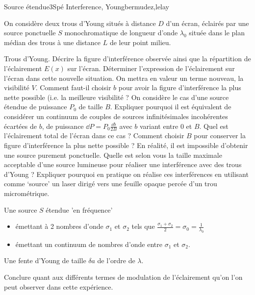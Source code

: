 \begin{exercise}{Source étendue}{3}{Spé}
{Interference, Young}{bermudez,lelay}

On considère deux trous d'Young situés à distance $D$ d'un écran, éclairés par une source ponctuelle $S$ monochromatique de longueur d'onde $\lambda_0$ située dans le plan médian des trous à une distance $L$ de leur point milieu.

\begin{questions}
    \questioncours Trous d'Young. Décrire la figure d'interférence observée ainsi que la répartition de l'éclairement $E(x)$ sur l'écran.
    \question Déterminer l'expression de l'éclairement sur l'écran dans cette nouvelle situation. On mettra en valeur un terme nouveau, la visibilité $V$. Comment faut-il choisir $b$ pour avoir la figure d'interférence la plus nette possible (i.e. la meilleure visibilité ?
    \question On considère le cas d'une source étendue de puissance $P_0$ de taille $B$. Expliquer pourquoi il est équivalent de considérer un continuum de couples de sources infinitésimales incohérentes écartées de $b$, de puissance $\dd{P} = P_0 \frac{\dd{b}}{2B}$ avec $b$ variant entre $0$ et $B$.
    \question Quel est l'éclairement total de l'écran dans ce cas ? Comment choisir $B$ pour conserver la figure d'interférence la plus nette possible ?
    \question En réalité, il est impossible d'obtenir une source purement ponctuelle. Quelle est selon vous la taille maximale acceptable d'une source lumineuse pour réaliser une interférence avec des trous d'Young ? Expliquer pourquoi en pratique on réalise ces interférences en utilisant comme `source' un laser dirigé vers une feuille opaque percée d'un trou micrométrique.
    
    \question Une source $S$ étendue 'en fréquence'
    \begin{itemize}
        \item émettant à 2 nombres d'onde $\sigma_1$ et $\sigma_2$ tels que $\frac{\sigma_1+\sigma_2}2 = \sigma_0 = \frac1{\lambda_0}$
        \item émettant un continuum de nombres d'onde entre $\sigma_1$ et $\sigma_2$.
    \end{itemize}
    
    \question Une fente d'Young de taille $\delta a$ de l'ordre de $\lambda$.
    
    \question Conclure quant aux différents termes de modulation de l'éclairement qu'on l'on peut observer dans cette expérience.
\end{questions}

\end{exercise}